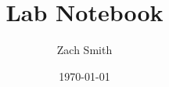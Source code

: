 \documentclass[11pt]{book}
\begin{document}
\title{Lab Notebook}
\author{Zach Smith}
\date{\today}
\maketitle
\end{document}
